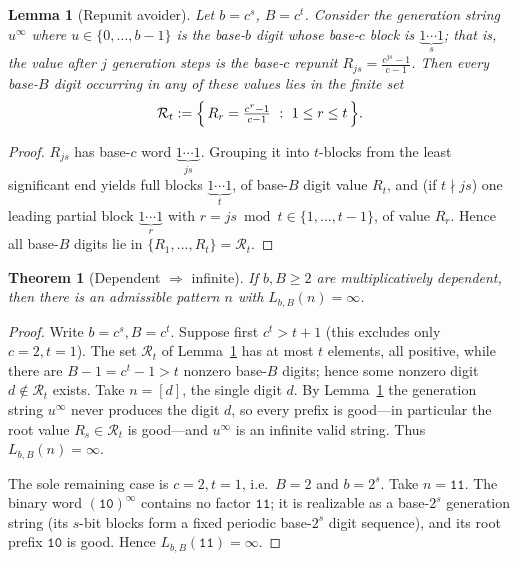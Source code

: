 \documentclass[11pt]{article}
\theoremstyle{plain}
\newtheorem{theorem}{Theorem}
\newtheorem{lemma}{Lemma}
\theoremstyle{definition}
\theoremstyle{remark}
\newcommand{\Lbb}{L_{b,B}}
\begin{document}
\begin{lemma}[Repunit avoider]\label{lem:repunit}
Let $b=c^{s}$, $B=c^{t}$. Consider the generation string $u^{\infty}$ where $u\in\{0,\dots,b-1\}$ is the base-$b$ digit whose base-$c$ block is $\underbrace{1\cdots1}_{s}$; that is, the value after $j$ generation steps is the base-$c$ repunit $R_{js}=\frac{c^{js}-1}{c-1}$. Then every base-$B$ digit occurring in any of these values lies in the finite set
\[
\mathcal R_t:=\Bigl\{\,R_r=\tfrac{c^{r}-1}{c-1}\ :\ 1\le r\le t\,\Bigr\}.
\]
\end{lemma}

\begin{proof}
$R_{js}$ has base-$c$ word $\underbrace{1\cdots1}_{js}$. Grouping it into $t$-blocks from the least significant end yields full blocks $\underbrace{1\cdots1}_{t}$, of base-$B$ digit value $R_t$, and (if $t\nmid js$) one leading partial block $\underbrace{1\cdots1}_{r}$ with $r=js\bmod t\in\{1,\dots,t-1\}$, of value $R_r$. Hence all base-$B$ digits lie in $\{R_1,\dots,R_t\}=\mathcal R_t$.
\end{proof}

\begin{theorem}[Dependent $\Rightarrow$ infinite]\label{thm:dep}
If $b,B\ge2$ are multiplicatively dependent, then there is an admissible pattern $n$ with $\Lbb(n)=\infty$.
\end{theorem}

\begin{proof}
Write $b=c^{s},B=c^{t}$. Suppose first $c^{t}>t+1$ (this excludes only $c=2,t=1$). The set $\mathcal R_t$ of Lemma~\ref{lem:repunit} has at most $t$ elements, all positive, while there are $B-1=c^{t}-1>t$ nonzero base-$B$ digits; hence some nonzero digit $d\notin\mathcal R_t$ exists. Take $n=[d]$, the single digit $d$. By Lemma~\ref{lem:repunit} the generation string $u^{\infty}$ never produces the digit $d$, so every prefix is good---in particular the root value $R_s\in\mathcal R_t$ is good---and $u^{\infty}$ is an infinite valid string. Thus $\Lbb(n)=\infty$.

The sole remaining case is $c=2,t=1$, i.e.\ $B=2$ and $b=2^{s}$. Take $n=\texttt{11}$. The binary word $(\texttt{10})^{\infty}$ contains no factor $\texttt{11}$; it is realizable as a base-$2^{s}$ generation string (its $s$-bit blocks form a fixed periodic base-$2^{s}$ digit sequence), and its root prefix $\texttt{10}$ is good. Hence $\Lbb(\texttt{11})=\infty$.
\end{proof}
\end{document}
